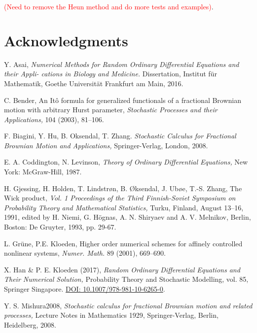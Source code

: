 \documentclass[reqno,12pt]{amsart}
\theoremstyle{plain}%
\theoremstyle{definition}
\begin{document}
\textcolor{red}{(Need to remove the Heun method and do more tests and examples)}.

\section*{Acknowledgments}

\begin{thebibliography}{25}
     Y. Asai, \emph{Numerical Methods for Random Ordinary Differential Equations and their Appli-
    cations in Biology and Medicine.} Dissertation, Institut für Mathematik, Goethe Universität Frankfurt am Main, 2016.

     C. Bender, An It\^o formula for generalized functionals of a fractional Brownian motion with arbitrary Hurst parameter, \emph{Stochastic Processes and their Applications,} 104 (2003), 81--106.

     F. Biagini, Y. Hu, B. Oksendal, T. Zhang. \emph{Stochastic Calculus for Fractional Brownian Motion and Applications,} Springer-Verlag, London, 2008.

     E. A. Coddington, N. Levinson, \emph{Theory of Ordinary Differential Equations,} New York: McGraw-Hill, 1987.

     H. Gjessing, H. Holden, T. Lindstr\o n, B. \O ksendal, J. Ub\o e, T.-S. Zhang, The Wick product, \emph{Vol. 1 Proceedings of the Third Finnish-Soviet Symposium on Probability Theory and Mathematical Statistics,} Turku, Finland, August 13--16, 1991, edited by H. Niemi, G. Högnas, A. N. Shiryaev and A. V. Melnikov, Berlin, Boston: De Gruyter, 1993, pp. 29-67.

     L. Gr\"une, P.E. Kloeden, Higher order numerical schemes for affinely controlled nonlinear systems, \emph{Numer. Math.} 89 (2001), 669--690.

     X. Han \& P. E. Kloeden (2017), \emph{Random Ordinary Differential Equations and Their Numerical Solution,} Probability Theory and Stochastic Modelling, vol. 85, Springer Singapore. \href{https://link.springer.com/book/10.1007/978-981-10-6265-0}{DOI: 10.1007/978-981-10-6265-0}.

     Y. S. Mishura2008, \emph{Stochastic calculus for fractional Brownian motion and related processes,} Lecture Notes in Mathematics 1929, Springer-Verlag, Berlin, Heidelberg, 2008.

\end{thebibliography}
\end{document}
